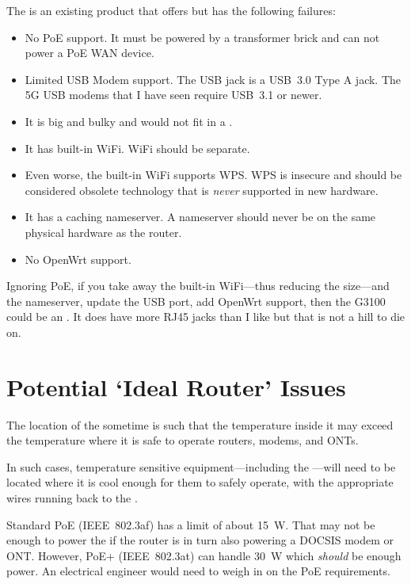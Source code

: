 The  is an existing product that offers  but has the
following failures:

\begin{itemize}
  \item No PoE support. It must be powered by a transformer brick and can not power a PoE WAN device.
  \item Limited USB Modem support. The USB jack is a USB~3.0 Type A jack. The 5G USB modems that I have seen
        require USB~3.1 or newer.
  \item It is big and bulky and would not fit in a \tcab{}.
  \item It has built-in WiFi. WiFi should be separate.
  \item Even worse, the built-in WiFi supports WPS. WPS is insecure and should be considered obsolete
        technology that is \emph{never} supported in new hardware.
  \item It has a caching nameserver. A nameserver should never be on the same physical hardware as the
        router.
  \item No OpenWrt support.
\end{itemize}

Ignoring PoE, if you take away the built-in WiFi---thus reducing the size---and the nameserver, update the USB port,
add OpenWrt support, then the G3100 could be an . It does have more RJ45 jacks than I like but
that is not a hill to die on.


\section{Potential `Ideal Router' Issues}

The location of the \tcab{} sometime is such that the temperature inside it
may exceed the temperature where it is safe to operate routers, modems, and ONTs.

In such cases, temperature sensitive equipment---including the ---will need to be
located where it is cool enough for them to safely operate, with the appropriate wires running back to the
\tcab{}.

Standard PoE (IEEE~802.3af) has a limit of about \qty{15}{\watt}. That may not be enough to power the
 if the router is in turn also powering a DOCSIS modem or ONT. However, PoE+ (IEEE~802.3at)
can handle \qty{30}{\watt} which \emph{should} be enough power. An electrical engineer would need to weigh in
on the PoE requirements.

